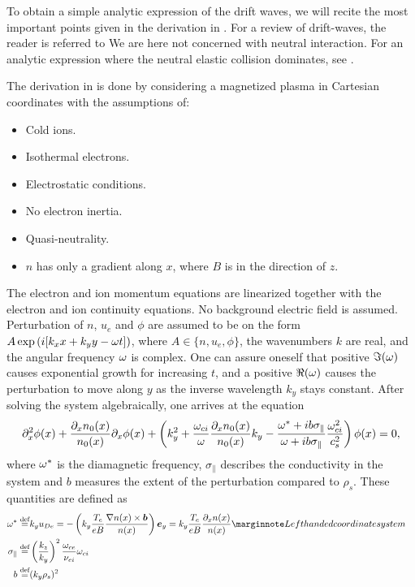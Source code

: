 To obtain a simple analytic expression of the drift waves, we will recite the most important points given in the derivation in \cite{Pecseli2016book}.
For a review of drift-waves, the reader is referred to \cite{Horton1999}
We are here not concerned with neutral interaction.
For an analytic expression where the neutral elastic collision dominates, see \cite{Ellis1980}.

The derivation in \cite{Pecseli2016book} is done by considering a magnetized plasma in Cartesian coordinates with the assumptions of:
%
\begin{itemize}[noitemsep]
    \item Cold ions.
    \item Isothermal electrons.
    \item Electrostatic conditions.
    \item No electron inertia.
    \item Quasi-neutrality.
    \item $n$ has only a gradient along $x$, where $B$ is in the direction of $z$.
\end{itemize}
%
The electron and ion momentum equations are linearized together with the electron and ion continuity equations.
No background electric field is assumed.
Perturbation of $n$, $u_e$ and $\phi$ are assumed to be on the form $A\exp\left(i[k_x x + k_y y - \omega t]\right)$, where $A \in \{n, u_e, \phi\}$, the wavenumbers $k$ are real, and the angular frequency $\omega$ is complex.
One can assure oneself that positive $\Im(\omega)$ causes exponential growth for increasing $t$, and a positive $\Re(\omega)$ causes the perturbation to move along $y$ as the inverse wavelength $k_y$ stays constant.
After solving the system algebraically, one arrives at the equation
%
\begin{align}
    \partial_x^2 \phi(x) +
    \frac{\partial_x n_0(x)}{n_0(x)}\partial_x \phi(x)+
    \left(k_y^2 +
    \frac{\omega_{ci}}{\omega}\frac{\partial_x n_0(x)}{n_0(x)}k_y -
    \frac{\omega^*+ib\sigma_\|}{\omega+ib\sigma_\|}\frac{\omega_{ci}^2}{c_s^2}
    \right)\phi(x)
    =0,
    \label{eq:fullDisp}
\end{align}
%
where $\omega^*$ is the diamagnetic frequency, $\sigma_\|$ describes the conductivity in the system and $b$ measures the extent of the perturbation compared to $\rho_s$.
These quantities are defined as
%
\begin{align*}
    \om^* \defined& k_y u_{De} =
    -\L(k_y \frac{T_e}{eB}\frac{\grad n(x)\times \ve{b}}{n(x)}\R)\ve{e}_y
    =
    k_y \frac{T_e}{eB}\frac{\partial_x n(x)}{n(x)}
    \note{Left handed coordinate system}
    \\
    \sigma_\| \defined& \L(\frac{k_z}{k_y}\R)^2 \frac{\om_{ce}}{\nu_{ei}}\om_{ci}\\
    b \defined& (k_y \rho_s)^2&
\end{align*}
